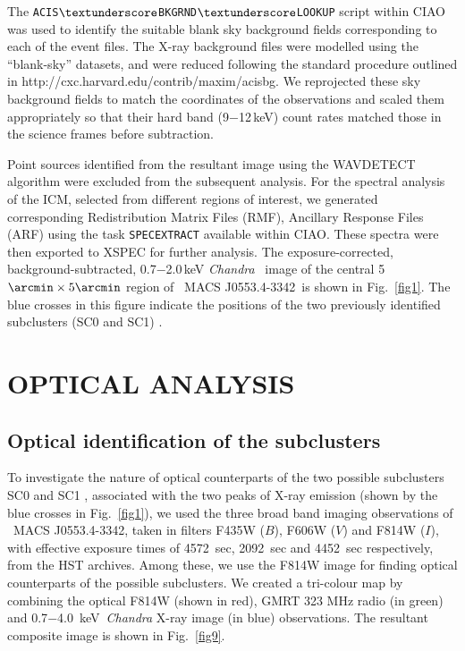 \documentclass[useASM,usenatbib]{mn2e}
\newcommand\chandra{{\it Chandra}}
\newcommand\kev{{\rm~keV}}
\newcommand{\mac}{\rm~MACS J0553.4-3342}
\begin{document}
The {\tt ACIS$\textunderscore$BKGRND$\textunderscore$LOOKUP} script
within CIAO was used to identify the suitable blank sky background
fields corresponding to each of the event files. The X-ray background
files were modelled using the ``blank-sky'' datasets,
and were
reduced following the standard procedure outlined in
{\color{blue}http://cxc.harvard.edu/contrib/maxim/acisbg}. We
reprojected these sky background fields to match the coordinates of
the observations and scaled them appropriately so that their hard band
(9$-$12\,keV) count rates matched those in the science frames
before subtraction.

Point sources identified from the resultant image
using the {\ttfamily WAVDETECT} algorithm were excluded from the
subsequent analysis.  For the spectral analysis of the ICM, selected from
different regions of interest, we generated corresponding
Redistribution Matrix Files (RMF), Ancillary Response Files (ARF)
using the task {\tt SPECEXTRACT} available within CIAO. These spectra
were then exported to XSPEC \citep[version
  12.9.1,][]{1996ASPC..101...17A} for further analysis. The
exposure-corrected, background-subtracted, 0.7$-$2.0\,keV \chandra~
image of the central 5$\arcmin \times 5\arcmin$ region of \mac~is
shown in Fig.~\ref{fig1}. The blue crosses in this figure indicate the
positions of the two  previously identified subclusters (SC0 and SC1)
\citep{2012MNRAS.420.2120M}.




\section{OPTICAL ANALYSIS}


  \subsection{Optical identification of the subclusters}
To investigate the nature of optical counterparts of the
two possible  subclusters SC0 and SC1 \citep{2012MNRAS.426...40B},
 associated  with  the  two  peaks of X-ray  emission   (shown 
by the blue crosses in Fig.~\ref{fig1}), we used the three broad band
imaging observations of \mac, taken in  filters F435W ($B$),
F606W ($V$) and F814W ($I$), with effective exposure times of 4572~sec,
2092~sec and 4452~sec respectively,  from the HST archives.
Among these, we use the F814W image for
finding optical counterparts of the  possible subclusters.
We created a tri-colour map by combining  the optical F814W (shown in red), GMRT 323
MHz radio (in green) \citep{2012MNRAS.426...40B} and
0.7$-$4.0\kev~\textit{Chandra} X-ray image (in blue) observations.
The resultant  composite image is shown in Fig.~\ref{fig9}.
\end{document}
